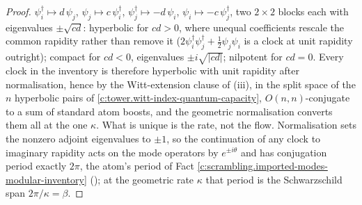 \documentclass[11pt]{article}
\theoremstyle{definition}
\theoremstyle{plain}
\begin{document}
\begin{proof}
$\psi_i^\dagger \mapsto d\,\psi_j$, $\psi_j \mapsto c\,\psi_i^\dagger$, $\psi_j^\dagger \mapsto -d\,\psi_i$, $\psi_i \mapsto -c\,\psi_j^\dagger$, two $2 \times 2$ blocks each with eigenvalues $\pm\sqrt{cd}$: hyperbolic for $cd > 0$, where unequal coefficients rescale the common rapidity rather than remove it ($2\psi_i^\dagger\psi_j^\dagger + \tfrac12\psi_j\psi_i$ is a clock at unit rapidity outright); compact for $cd < 0$, eigenvalues $\pm i\sqrt{|cd|}$; nilpotent for $cd = 0$. Every clock in the inventory is therefore hyperbolic with unit rapidity after normalisation, hence by the Witt-extension clause of (iii), in the split space of the $n$ hyperbolic pairs of \ref{c:tower.witt-index-quantum-capacity}, $O(n,n)$-conjugate to a sum of standard atom boosts, and the geometric normalisation converts them all at the one $\kappa$. What is unique is the rate, not the flow. Normalisation sets the nonzero adjoint eigenvalues to $\pm 1$, so the continuation of any clock to imaginary rapidity acts on the mode operators by $e^{\pm i\theta}$ and has conjugation period exactly $2\pi$, the atom's period of Fact \ref{c:scrambling.imported-modes-modular-inventory} (\cite[Prop.~7.21(1)]{ButlerT5}); at the geometric rate $\kappa$ that period is the Schwarzschild span $2\pi/\kappa = \beta$.

\end{proof}
\end{document}
